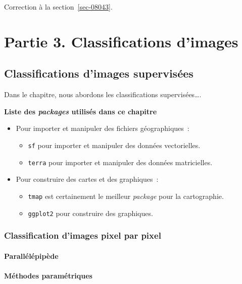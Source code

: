 \documentclass[
  letterpaper,
  DIV=11,
  numbers=noendperiod]{scrreprt}
\providecommand{\tightlist}{%
  \setlength{\itemsep}{0pt}\setlength{\parskip}{0pt}}\usepackage{longtable,booktabs,array}
\begin{document}
Correction à la section~\ref{sec-08043}.

\part{Partie 3. Classifications d'images}


\chapter{Classifications d'images supervisées}\label{sec-chap05}

Dans le chapitre, nous abordons les classifications supervisées\ldots.

\textbf{Liste des \emph{packages} utilisés dans ce chapitre}

\begin{itemize}
\tightlist
\item
  Pour importer et manipuler des fichiers géographiques~:

  \begin{itemize}
  \tightlist
  \item
    \texttt{sf} pour importer et manipuler des données vectorielles.
  \item
    \texttt{terra} pour importer et manipuler des données matricielles.
  \end{itemize}
\item
  Pour construire des cartes et des graphiques~:

  \begin{itemize}
  \tightlist
  \item
    \texttt{tmap} est certainement le meilleur \emph{package} pour la
    cartographie.
  \item
    \texttt{ggplot2} pour construire des graphiques.
  \end{itemize}
\end{itemize}

\section{Classification d'images pixel par pixel}\label{sec-051}

\subsection{Parallélépipède}\label{sec-0511}

\subsection{Méthodes paramétriques}\label{sec-0512}
\end{document}
